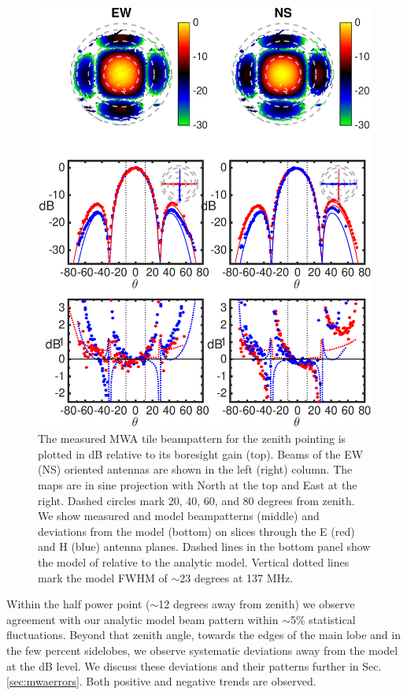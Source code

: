 \begin{figure}
\includegraphics[width=5in]{chap1_precision_beammapping_figures/Zenith_abs.eps}
\caption[Measured MWA tile beampattern for the zenith pointing.]{The measured MWA tile beampattern for the zenith pointing is plotted in dB relative to its boresight gain (top). Beams of the EW (NS) oriented antennas are shown in the left (right) column. The maps are in sine projection with North at the top and East at the right. Dashed circles mark 20, 40, 60, and 80 degrees from zenith. We show measured and model beampatterns (middle) and deviations from the model (bottom) on slices through the E (red) and H (blue) antenna planes. Dashed lines in the bottom panel show the model of \citet{sutinjo15} relative to the analytic model. Vertical dotted lines mark the model FWHM of $\sim$23 degrees at 137 MHz.}
\label{fig:zenithtilemap}
\end{figure}

Within the half power point ($\sim$12 degrees away from zenith) we observe agreement with our analytic model beam pattern within $\sim$5\% statistical fluctuations. Beyond that zenith angle, towards the edges of the main lobe and in the few percent sidelobes, we observe systematic deviations away from the model at the dB level. We discuss these deviations and their patterns further in Sec. \ref{sec:mwaerrors}. Both positive and negative trends are observed.

